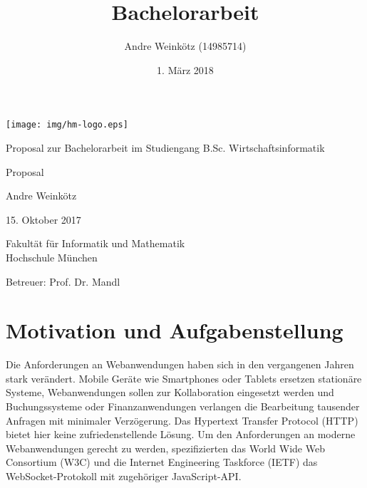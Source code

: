 \documentclass[11pt,a4paper,titlepage]{scrartcl}
\title{Bachelorarbeit}
\author{Andre Weinkötz (14985714)}
\date{1. März 2018}
\numberwithin{equation}{section}
\begin{document}
  \pagestyle{empty}

  \begin{titlepage}

\begin{center}
	\texttt{[image: img/hm-logo.eps]}
\end{center}
 \bigskip

 \begin{center} \large 
    
    Proposal zur Bachelorarbeit im Studiengang B.Sc. Wirtschaftsinformatik
    \vspace*{2.5cm}

    {\huge Proposal} \\ \vspace*{0.5cm}
    
    \vspace*{2.5cm}

    Andre Weinkötz \bigskip
    
    

    15. Oktober 2017
    \vspace*{2.5cm}
    
    

    Fakultät für Informatik und Mathematik \\
	Hochschule München\bigskip
	
	Betreuer: Prof. Dr. Mandl 
	
	
  \end{center}
\end{titlepage}


 \tableofcontents

\newpage
  \pagestyle{headings}

\section{Motivation und Aufgabenstellung}
Die Anforderungen an Webanwendungen haben sich in den vergangenen Jahren stark verändert. Mobile Geräte wie Smartphones oder Tablets ersetzen stationäre Systeme, Webanwendungen sollen zur Kollaboration eingesetzt werden und Buchungssysteme oder Finanzanwendungen verlangen die Bearbeitung tausender Anfragen mit minimaler Verzögerung. Das Hypertext Transfer Protocol (HTTP) bietet hier keine zufriedenstellende Lösung. Um den Anforderungen an moderne Webanwendungen gerecht zu werden, spezifizierten das World Wide Web Consortium (W3C) und die Internet Engineering Taskforce (IETF) das WebSocket-Protokoll mit zugehöriger JavaScript-API. \\
\end{document}

